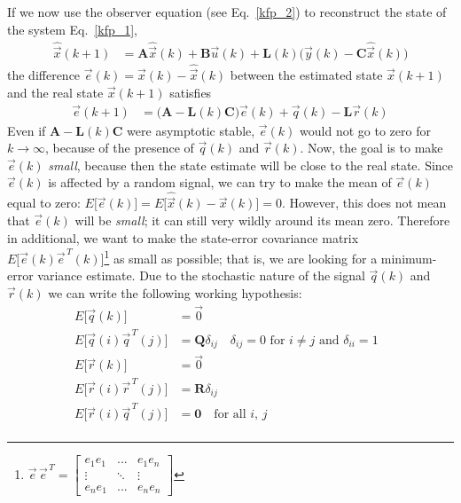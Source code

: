 \documentclass[11pt,a4paper,oneside]{book}
\numberwithin{equation}{section}
\theoremstyle{it}
\theoremstyle{definition}
\begin{document}
If we now use the observer equation (see Eq.~\eqref{kfp_2}) to reconstruct the 
state of the system Eq.~\eqref{kfp_1}, 
\begin{equation}\label{kfp_2}
	\begin{aligned}
		\hat{\vec{x}}(k+1) &= \mathbf{A}\hat{\vec{x}}(k)+\mathbf{B}\vec{u}(k) + 
		\mathbf{L}(k)\Big(\vec{y}(k)-\mathbf{C}\hat{\vec{x}}(k)\Big)
	\end{aligned}
\end{equation}
the difference $\vec{e}(k)=\vec{x}(k)-\hat{\vec{x}}(k)$ between the estimated 
state $\hat{\vec{x}}(k+1)$ and the real state ${\vec{x}}(k+1)$ satisfies
\begin{equation}\label{kfp_3}
	\begin{aligned}
		{\vec{e}}(k+1) &= 
		\Big(\mathbf{A}-\mathbf{L}(k)\mathbf{C}\Big){\vec{e}}(k)+\vec{q}(k) - 
		\mathbf{L}\vec{r}(k)
	\end{aligned}
\end{equation}
Even if $\mathbf{A}-\mathbf{L}(k)\mathbf{C}$ were asymptotic stable, 
$\vec{e}(k)$ would not go to zero for $k\rightarrow\infty$, because of the 
presence of $\vec{q}(k)$ and $\vec{r}(k)$. Now, the goal is to make 
$\vec{e}(k)$ \textit{small}, because then the state estimate will be close to 
the real state. Since $\vec{e}(k)$ is affected by a random signal, we can try 
to make the mean of $\vec{e}(k)$ equal to zero: $E\Big[\vec{e}(k)\Big] = 
E\Big[\hat{\vec{x}}(k)-\vec{x}(k)\Big]=0$. However, this does not mean that 
$\vec{e}(k)$ will be \textit{small}; it can still very wildly around its mean 
zero. Therefore in additional, we want to make the state-error covariance 
matrix $E\Big[\vec{e}(k)\vec{e}^{\,T}(k)\Big]$\footnote{$\vec{e}\,\vec{e}^{\,T} 
= \begin{bmatrix}
		e_1e_1& ... & e_1e_n \\ \vdots&\ddots&\vdots \\ e_ne_1&...&e_ne_n
	\end{bmatrix}$} as small as possible; that is, we are looking for a 
	minimum-error variance estimate. 
Due to the stochastic nature of the signal $\vec{q}(k)$ and $\vec{r}(k)$ we can 
write the following working hypothesis:
\begin{equation}\label{kfp_4}
	\begin{aligned}
		E\Big[\vec{q}(k)\Big] &= \vec{0} \\[6pt]
		E\Big[\vec{q}(i)\vec{q}^{\,T}(j)\Big] &= \mathbf{Q}\delta_{ij} 
		\quad\text{$\delta_{ij} =0$ for $i\ne j$ and $\delta_{ii}=1$ }\\[6pt]
		E\Big[\vec{r}(k)\Big] &= \vec{0} \\[6pt]
		E\Big[\vec{r}(i)\vec{r}^{\,T}(j)\Big] &= \mathbf{R}\delta_{ij} \\[6pt]
		E\Big[\vec{r}(i)\vec{q}^{\,T}(j)\Big] &= \mathbf{0} \quad\text{for all 
		}i,\,j \\[6pt]
	\end{aligned}
\end{equation}
\end{document}

